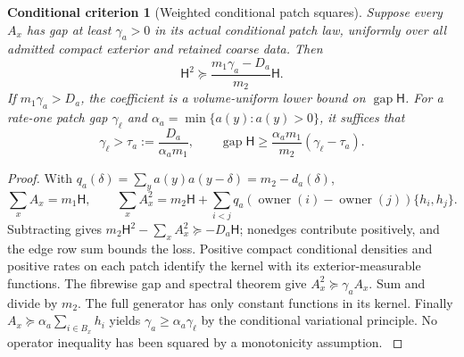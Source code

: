 \documentclass[11pt,oneside,openany]{book}
\newtheorem{criterion}[criterion]{Conditional criterion}
\theoremstyle{definition}
\theoremstyle{remark}
\newcommand{\gap}{\operatorname{gap}}
\newcommand{\src}[2]{\cite[#2]{#1}}
\begin{document}
\begin{criterion}[Weighted conditional patch squares]
\label{crit:weighted-patches}
Suppose every $A_x$ has gap at least $\gamma_a>0$ in its actual
conditional patch law, uniformly over all admitted compact exterior
and retained coarse data. Then
\begin{equation}\label{eq:weighted-patches}
 \mathsf H^2\succeq\frac{m_1\gamma_a-D_a}{m_2}\mathsf H.
\end{equation}
If $m_1\gamma_a>D_a$, the coefficient is a volume-uniform lower bound
on $\gap\mathsf H$. For a rate-one patch gap $\gamma_\ell$ and
$\alpha_a=\min\{a(y):a(y)>0\}$, it suffices that
\[
 \gamma_\ell>\tau_a:=\frac{D_a}{\alpha_a m_1},\qquad
 \gap\mathsf H\ge\frac{\alpha_a m_1}{m_2}(\gamma_\ell-\tau_a).
\]
\end{criterion}
\begin{proof}
With $q_a(\delta)=\sum_y a(y)a(y-\delta)=m_2-d_a(\delta)$,
\[
 \sum_x A_x=m_1\mathsf H,\qquad
 \sum_x A_x^2=m_2\mathsf H+
       \sum_{i<j}q_a(\operatorname{owner}(i)-\operatorname{owner}(j))
                                                  \{h_i,h_j\}.
\]
Subtracting gives
$m_2\mathsf H^2-\sum_xA_x^2\succeq-D_a\mathsf H$;
nonedges contribute positively, and the edge row sum bounds the loss.
Positive compact conditional densities and positive rates on each
patch identify the kernel with its exterior-measurable functions.
The fibrewise gap and spectral theorem give
$A_x^2\succeq\gamma_a A_x$. Sum and divide by $m_2$.
The full generator has only constant functions in its kernel.
Finally $A_x\succeq\alpha_a\sum_{i\in B_x}h_i$ yields
$\gamma_a\ge\alpha_a\gamma_\ell$ by the conditional variational
principle. No operator inequality has been squared by a monotonicity
assumption. \src{F12}{V63}
\end{proof}
\end{document}
